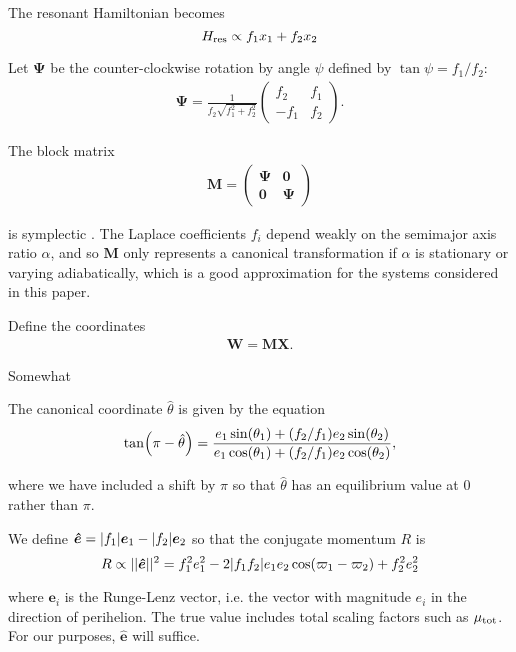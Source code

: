 \documentclass{mnras}
\renewcommand{\v}[1]{\boldsymbol{ #1 }}
\DeclarePairedDelimiter{\abs}{|}{|}
\DeclarePairedDelimiter{\norm}{||}{||}
\DeclarePairedDelimiter{\p}{(}{)}
\begin{document}
The resonant Hamiltonian becomes
\[ H_{\rm res} \propto f_1 x_1 + f_2 x_2 \]

Let \(\v \Psi\) be the
counter-clockwise rotation by angle \(\psi\) defined by \(\tan\psi=
f_1/f_2\):
\begin{align}
  \v \Psi = \frac{1}{f_2\sqrt{f_1^2+f_2^2}} 
  \begin{pmatrix}
    f_2 & f_1 \\
    -f_1 & f_2 
  \end{pmatrix}.
\end{align}

The block matrix
\begin{align}
  \v M =
  \begin{pmatrix}
    \v \Psi & \v 0 \\
    \v 0 & \v \Psi
  \end{pmatrix}
\end{align}

is symplectic \cite{goldstein_classical_2000}.  The Laplace coefficients
\(f_i\) depend weakly on the semimajor axis ratio \(\alpha\), and so \(\v
M\) only represents a canonical transformation if \(\alpha\) is
stationary or varying adiabatically, which is a good approximation
for the systems considered in this paper.

Define the coordinates
\begin{align}
  \v W = \v M \v X.
\end{align}

Somewhat 

The canonical coordinate \(\hat{\theta}\) is given by the equation
\begin{align}
\label{hattheta}
  \tan\p*{\pi-\hat{\theta}} = \frac{e_1\sin(\theta_1)
  + (f_2/f_1)e_2\sin(\theta_2)}{e_1\cos(\theta_1) + (f_2/f_1)e_2\cos(\theta_2)},
\end{align}

where we have included a shift by \(\pi\) so that \(\hat{\theta}\) has an
equilibrium value at \(0\) rather than \(\pi\).

We define \(\v{\hat e} = \abs{f_1}\v e_1 - \abs{f_2}\v e_2\) so that
the conjugate momentum \(R\) is
\begin{equation}
  R \propto \norm{\v{\hat e}}^2  = f_1^2e_1^2 - 2\abs{f_1f_2}e_1e_2\cos(\varpi_1-\varpi_2) + f_2^2e_2^2
\end{equation}

where \(\v e_i\) is the Runge-Lenz vector, i.e. the vector with
magnitude \(e_i\) in the direction of perihelion. The true value
includes total scaling factors such as \(\mu_{\rm tot}\). For our
purposes, \(\v{\hat e}\) will suffice.
\end{document}
